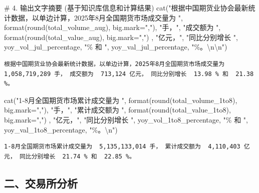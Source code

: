 \documentclass[
  letterpaper,
  DIV=11,
  numbers=noendperiod]{scrartcl}
\newenvironment{Shaded}{\begin{snugshade}}{\end{snugshade}}
\newcommand{\AttributeTok}[1]{\textcolor[rgb]{0.40,0.45,0.13}{#1}}
\newcommand{\CommentTok}[1]{\textcolor[rgb]{0.37,0.37,0.37}{#1}}
\newcommand{\FunctionTok}[1]{\textcolor[rgb]{0.28,0.35,0.67}{#1}}
\newcommand{\NormalTok}[1]{\textcolor[rgb]{0.00,0.23,0.31}{#1}}
\newcommand{\SpecialCharTok}[1]{\textcolor[rgb]{0.37,0.37,0.37}{#1}}
\newcommand{\StringTok}[1]{\textcolor[rgb]{0.13,0.47,0.30}{#1}}
\begin{document}
\begin{Shaded}
\begin{Highlighting}[]
\CommentTok{\# 4. 输出文字摘要 (基于知识库信息和计算结果)}
\FunctionTok{cat}\NormalTok{(}\StringTok{"根据中国期货业协会最新统计数据，以单边计算，2025年8月全国期货市场成交量为 "}\NormalTok{, }
    \FunctionTok{format}\NormalTok{(}\FunctionTok{round}\NormalTok{(total\_volume\_aug), }\AttributeTok{big.mark=}\StringTok{","}\NormalTok{), }\StringTok{"手，"}\NormalTok{, }
    \StringTok{"成交额为 "}\NormalTok{, }\FunctionTok{format}\NormalTok{(}\FunctionTok{round}\NormalTok{(total\_value\_aug), }\AttributeTok{big.mark=}\StringTok{","}\NormalTok{) , }\StringTok{"亿元，"}\NormalTok{,}
    \StringTok{"同比分别增长 "}\NormalTok{, yoy\_vol\_jul\_percentage, }\StringTok{"\% 和 "}\NormalTok{, yoy\_val\_jul\_percentage, }\StringTok{"\%。}\SpecialCharTok{\textbackslash{}n\textbackslash{}n}\StringTok{"}\NormalTok{)}
\end{Highlighting}
\end{Shaded}

\begin{verbatim}
根据中国期货业协会最新统计数据，以单边计算，2025年8月全国期货市场成交量为  1,058,719,289 手， 成交额为  713,124 亿元， 同比分别增长  13.98 % 和  21.38 %。
\end{verbatim}

\begin{Shaded}
\begin{Highlighting}[]
\FunctionTok{cat}\NormalTok{(}\StringTok{"1{-}8月全国期货市场累计成交量为 "}\NormalTok{, }
    \FunctionTok{format}\NormalTok{(}\FunctionTok{round}\NormalTok{(total\_volume\_1to8), }\AttributeTok{big.mark=}\StringTok{","}\NormalTok{), }\StringTok{"手，"}\NormalTok{,}
    \StringTok{"累计成交额为 "}\NormalTok{, }\FunctionTok{format}\NormalTok{(}\FunctionTok{round}\NormalTok{(total\_value\_1to8), }\AttributeTok{big.mark=}\StringTok{","}\NormalTok{) , }\StringTok{"亿元，"}\NormalTok{,}
    \StringTok{"同比分别增长 "}\NormalTok{, yoy\_vol\_1to8\_percentage, }\StringTok{"\% 和 "}\NormalTok{, yoy\_val\_1to8\_percentage, }\StringTok{"\%。}\SpecialCharTok{\textbackslash{}n}\StringTok{"}\NormalTok{)}
\end{Highlighting}
\end{Shaded}

\begin{verbatim}
1-8月全国期货市场累计成交量为  5,135,133,014 手， 累计成交额为  4,110,403 亿元， 同比分别增长  21.74 % 和  22.85 %。
\end{verbatim}

\subsection{二、交易所分析}\label{ux4e8cux4ea4ux6613ux6240ux5206ux6790}
\end{document}

